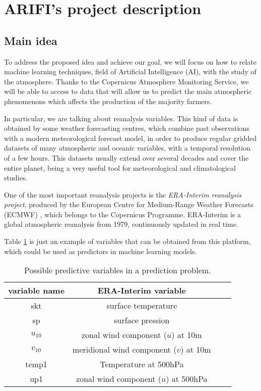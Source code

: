 \section{ARIFI's project description}
\subsection{Main idea}

To address the proposed idea and achieve our goal, we will focus on how to relate machine learning techniques, field of Artificial Intelligence (AI), with the study of the atmosphere. Thanks to the Copernicus Atmosphere Monitoring Service, we will be able to access to data that will allow us to predict the main atmospheric phenomenons which affects the production of the majority farmers.

In particular, we are talking about reanalysis variables. This kind of data is obtained by some weather forecasting centres, which combine past observations with a modern meteorological forecast model, in order to produce regular gridded datasets of many atmospheric and oceanic variables, with a temporal resolution of a few hours. This datasets usually extend over several decades and cover the entire planet, being a very useful tool for meteorological and climatological studies. 

One of the most important reanalysis projects is the {\em ERA-Interim reanalysis project}, produced by the European Centre for Medium-Range Weather Forecasts (ECMWF) \cite{ERA_Interim}, which belongs to the Copernicus Programme. ERA-Interim is a global atmospheric reanalysis from 1979, continuously updated in real time. 

Table \ref{Variables_ERA} is just an example of variables that can be obtained from this platform, which could be used as predictors in machine learning models.

\vspace{12pt}
\begin{table}[H]
\begin{center}
\caption{\label{Variables_ERA} Possible predictive variables in a prediction problem.}
\begin{tabular}{cccc}
\hline
variable name & ERA-Interim variable\\
\hline
\hline
skt & surface temperature\\
sp & surface pression\\
$u_{10}$& zonal wind component ($u$) at 10m\\
$v_{10}$& meridional wind component ($v$) at 10m\\
temp1& Temperature at 500hPa\\
up1& zonal wind component ($u$) at 500hPa\\
\hline
\end{tabular}
\end{center}
\end{table}
\vspace{12pt}

